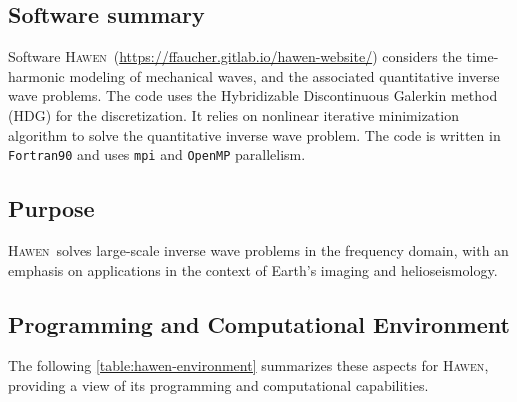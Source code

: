 \newcommand{\hawen}{\textsc{Hawen}}
\subsection{Software summary}
\label{sec:Hawen:summary}

Software \hawen~(\url{https://ffaucher.gitlab.io/hawen-website/})
considers the time-harmonic modeling of mechanical waves, and the 
associated quantitative inverse wave problems.
The code uses the Hybridizable Discontinuous Galerkin method (HDG) 
for the discretization. 
It relies on nonlinear iterative minimization algorithm to solve 
the quantitative inverse wave problem.
The code is written in \texttt{Fortran90} and uses \texttt{mpi}
and \texttt{OpenMP} parallelism.



\subsection{Purpose}
\label{sec:Hawen:purpose}

\hawen~solves large-scale inverse wave problems in the frequency domain, 
with an emphasis on applications in the context of Earth's imaging and helioseismology.


\subsection{Programming and Computational Environment}
\label{sec::Hawen:environment_capabilities}


The following \cref{table:hawen-environment} summarizes these aspects for \hawen, providing a  view of its programming and computational capabilities.

